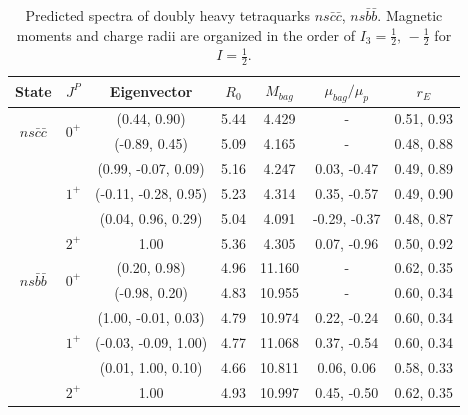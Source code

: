 \documentclass[12pt,onecolumn,floatfix,nofootinbib]{revtex4}
\begin{document}
\renewcommand{\tabcolsep}{0.55cm} \renewcommand{\arraystretch}{1.2}
\begin{table}[!htb]
\caption{Predicted spectra of doubly heavy tetraquarks $ns\bar{c}\bar{c}$, $%
ns\bar{b}\bar{b}$.  Magnetic moments and charge radii are organized in the 
order of $I_{3}=\frac{1}{2},\,-\frac{1}{2}$ for $I=\frac{1}{2}$.}
\label{tab:2heavytetraquark1/2}%
\begin{tabular}{ccccccc}
\hline\hline
\textrm{State} & $J^{P}$ & \textrm{Eigenvector} & $R_{0}$ & $M_{bag}$ & $%
\mu_{bag}/\mu_{p}$ & $r_{E}$ \\ \hline
\multirow{2}{*}{$ns\bar{c}\bar{c}$} & \multirow{2}{*}{$0^{+}$} & (0.44, 0.90)
& 5.44 & 4.429 & - & 0.51, 0.93 \\
&  & (-0.89, 0.45) & 5.09 & 4.165 & - & 0.48, 0.88 \\
& \multirow{3}{*}{$1^{+}$} & (0.99, -0.07, 0.09) & 5.16 & 4.247
& 0.03, -0.47 & 0.49, 0.89 \\
&  & (-0.11, -0.28, 0.95) & 5.23 & 4.314 & 0.35, -0.57 & 0.49, 0.90 \\
&  & (0.04, 0.96, 0.29) & 5.04 & 4.091 & -0.29, -0.37 & 0.48, 0.87 \\
& $2^{+}$ & 1.00 & 5.36 & 4.305 & 0.07, -0.96 & 0.50, 0.92 \\
\multirow{2}{*}{$ns\bar{b}\bar{b}$} & \multirow{2}{*}{$0^{+}$} & (0.20, 0.98)
& 4.96 & 11.160 & - & 0.62, 0.35 \\
&  & (-0.98, 0.20) & 4.83 & 10.955 & - & 0.60, 0.34 \\
& \multirow{3}{*}{$1^{+}$} & (1.00, -0.01, 0.03) & 4.79 & 10.974 
& 0.22, -0.24 & 0.60, 0.34 \\
&  & (-0.03, -0.09, 1.00) & 4.77 & 11.068 & 0.37, -0.54 & 0.60, 0.34 \\
&  & (0.01, 1.00, 0.10) & 4.66 & 10.811 & 0.06, 0.06 & 0.58, 0.33 \\
& $2^{+}$ & 1.00 & 4.93 & 10.997 & 0.45, -0.50 & 0.62, 0.35 \\ \hline\hline
\end{tabular}%
\end{table}
\end{document}
